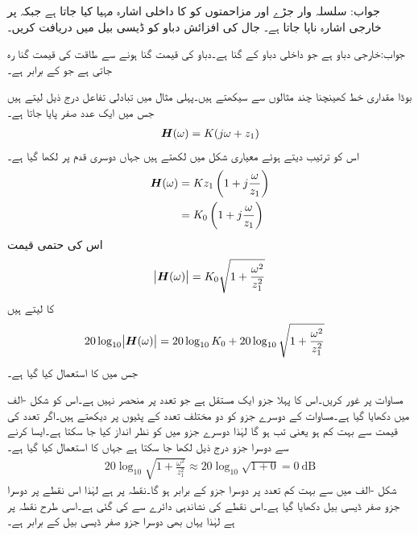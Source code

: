 جواب:
سلسلہ وار جڑے  اور  مزاحمتوں کو  کا داخلی اشارہ مہیا کیا جاتا ہے جبکہ   پر خارجی اشارہ  ناپا جاتا ہے۔ جال کی افزائش دباو کو ڈیسی بیل میں دریافت کریں۔

جواب:خارجی دباو  ہے جو داخلی دباو کے   گنا ہے۔دباو کی قیمت    گنا ہونے سے طاقت کی قیمت  گنا رہ جاتی ہے جو  کے برابر ہے۔

بوڈا مقداری خط کھینچنا چند مثالوں سے سیکھتے ہیں۔پہلی مثال میں تبادلی تفاعل درج ذیل لیتے ہیں جس میں ایک عدد صفر پایا جاتا ہے۔
\begin{align}\label{مساوات_تعددی_ایک_عدد_صفر_تفاعل_الف}
{\ensuremath{{\boldsymbol{H}}}}(\omega)=K(j\omega +z_1)
\end{align}
اس کو ترتیب دیتے ہوئے  معیاری شکل میں لکھتے ہیں جہاں دوسری قدم پر  لکھا گیا ہے۔
\begin{gather}
\begin{aligned}\label{مساوات_تعددی_ایک_عدد_صفر_تفاعل}
{\ensuremath{{\boldsymbol{H}}}}(\omega)&=K z_1\left(1+j\frac{\omega}{z_1}\right)\\
&=K_0\left(1+j\frac{\omega}{z_1}\right)
\end{aligned}
\end{gather}
اس کی حتمی قیمت
\begin{align}\label{مساوات_تعددی_ایک_عدد_صفر_تفاعل_ب}
\abs{{{\boldsymbol{H}}}(\omega)}=K_0 \sqrt{1+\frac{\omega^2}{z_1^2}}
\end{align}
کا  لیتے ہیں
\begin{align}\label{مساوات_تعددی_ایک_عدد_صفر_تفاعل_پ}
20 \log_{10}\abs{{{\boldsymbol{H}}}(\omega)}&=20 \log_{10} K_0 +20\log_{10}\sqrt{1+\frac{\omega^2}{z_1^2}}
\end{align}
جس میں  کا استعمال کیا گیا ہے۔

مساوات  پر غور کریں۔اس کا پہلا جزو ایک مستقل ہے جو تعدد پر منحصر نہیں ہے۔اس کو شکل -الف  میں دکھایا گیا ہے۔مساوات کے دوسرے جزو کو  دو مختلف تعدد کے پٹیوں پر دیکھتے ہیں۔اگر تعدد کی قیمت  سے بہت کم ہو یعنی  تب  ہو گا لہٰذا دوسرے جزو میں  کو نظر انداز کیا جا سکتا ہے۔ایسا کرنے سے دوسرا جزو درج ذیل لکھا جا سکتا ہے جہاں  کا استعمال کیا گیا ہے۔
\begin{align*}
20\log_{10}\sqrt{1+\frac{\omega^2}{z_1^2}}\approx 20\log_{10}\sqrt{1+0} =\SI{0}{\deci\bel}
\end{align*}
شکل -الف میں  سے بہت کم تعدد پر دوسرا جزو  کے برابر ہو گا۔نقطہ  پر  ہے لہٰذا اس نقطے پر دوسرا جزو صفر ڈیسی بیل دکھایا گیا ہے۔اس نقطے کی نشاندہی دائرے سے کی گئی ہے۔اسی طرح نقطہ  پر  ہے لہٰذا یہاں بھی دوسرا جزو صفر ڈیسی بیل کے برابر ہے۔

